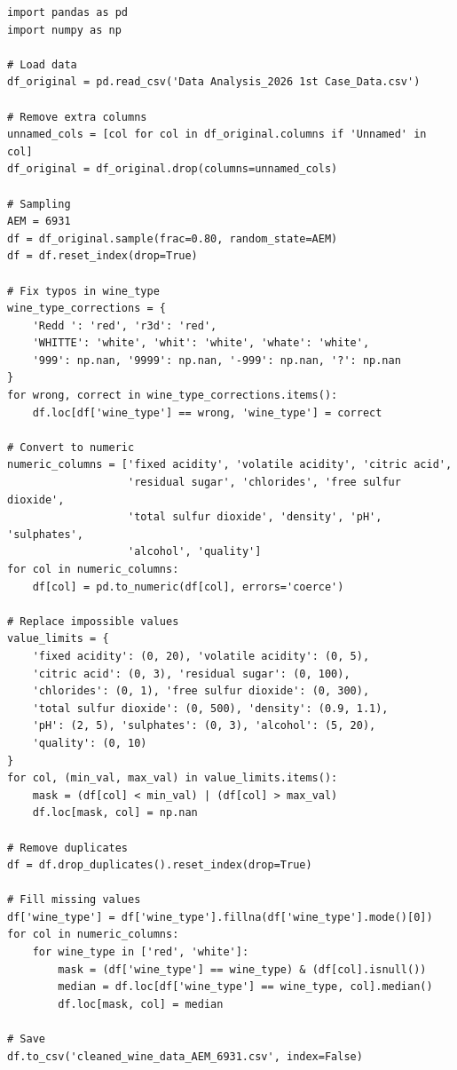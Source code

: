 \documentclass[12pt,a4paper]{article}
\begin{document}
\begin{lstlisting}[caption={Complete data cleaning code}]
import pandas as pd
import numpy as np

# Load data
df_original = pd.read_csv('Data Analysis_2026 1st Case_Data.csv')

# Remove extra columns
unnamed_cols = [col for col in df_original.columns if 'Unnamed' in col]
df_original = df_original.drop(columns=unnamed_cols)

# Sampling
AEM = 6931
df = df_original.sample(frac=0.80, random_state=AEM)
df = df.reset_index(drop=True)

# Fix typos in wine_type
wine_type_corrections = {
    'Redd ': 'red', 'r3d': 'red',
    'WHITTE': 'white', 'whit': 'white', 'whate': 'white',
    '999': np.nan, '9999': np.nan, '-999': np.nan, '?': np.nan
}
for wrong, correct in wine_type_corrections.items():
    df.loc[df['wine_type'] == wrong, 'wine_type'] = correct

# Convert to numeric
numeric_columns = ['fixed acidity', 'volatile acidity', 'citric acid',
                   'residual sugar', 'chlorides', 'free sulfur dioxide',
                   'total sulfur dioxide', 'density', 'pH', 'sulphates',
                   'alcohol', 'quality']
for col in numeric_columns:
    df[col] = pd.to_numeric(df[col], errors='coerce')

# Replace impossible values
value_limits = {
    'fixed acidity': (0, 20), 'volatile acidity': (0, 5),
    'citric acid': (0, 3), 'residual sugar': (0, 100),
    'chlorides': (0, 1), 'free sulfur dioxide': (0, 300),
    'total sulfur dioxide': (0, 500), 'density': (0.9, 1.1),
    'pH': (2, 5), 'sulphates': (0, 3), 'alcohol': (5, 20),
    'quality': (0, 10)
}
for col, (min_val, max_val) in value_limits.items():
    mask = (df[col] < min_val) | (df[col] > max_val)
    df.loc[mask, col] = np.nan

# Remove duplicates
df = df.drop_duplicates().reset_index(drop=True)

# Fill missing values
df['wine_type'] = df['wine_type'].fillna(df['wine_type'].mode()[0])
for col in numeric_columns:
    for wine_type in ['red', 'white']:
        mask = (df['wine_type'] == wine_type) & (df[col].isnull())
        median = df.loc[df['wine_type'] == wine_type, col].median()
        df.loc[mask, col] = median

# Save
df.to_csv('cleaned_wine_data_AEM_6931.csv', index=False)
\end{lstlisting}
\end{document}
